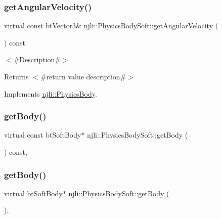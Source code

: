 \subsubsection{\texorpdfstring{get\+Angular\+Velocity()}{getAngularVelocity()}}
{\footnotesize\ttfamily virtual const bt\+Vector3\& njli\+::\+Physics\+Body\+Soft\+::get\+Angular\+Velocity (\begin{DoxyParamCaption}{ }\end{DoxyParamCaption}) const\hspace{0.3cm}{\ttfamily [virtual]}}

$<$\#\+Description\#$>$

\begin{DoxyReturn}{Returns}
$<$\#return value description\#$>$ 
\end{DoxyReturn}


Implements \mbox{\hyperlink{classnjli_1_1_physics_body_a598de298accae3b59c821ab8e640d464}{njli\+::\+Physics\+Body}}.

\mbox{\label{classnjli_1_1_physics_body_soft_a44c640897800dc6829b7a39284196596}} 
\subsubsection{\texorpdfstring{get\+Body()}{getBody()}\hspace{0.1cm}{\footnotesize\ttfamily [1/2]}}
{\footnotesize\ttfamily virtual const bt\+Soft\+Body$\ast$ njli\+::\+Physics\+Body\+Soft\+::get\+Body (\begin{DoxyParamCaption}{ }\end{DoxyParamCaption}) const\hspace{0.3cm}{\ttfamily [protected]}, {\ttfamily [virtual]}}

\mbox{\label{classnjli_1_1_physics_body_soft_afda8afc3d3ca4bcd805b134911f480a3}} 
\subsubsection{\texorpdfstring{get\+Body()}{getBody()}\hspace{0.1cm}{\footnotesize\ttfamily [2/2]}}
{\footnotesize\ttfamily virtual bt\+Soft\+Body$\ast$ njli\+::\+Physics\+Body\+Soft\+::get\+Body (\begin{DoxyParamCaption}{ }\end{DoxyParamCaption})\hspace{0.3cm}{\ttfamily [protected]}, {\ttfamily [virtual]}}

